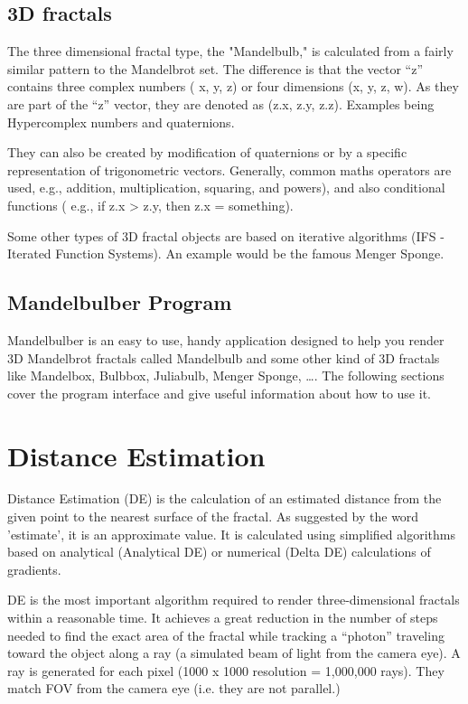 \hypertarget{d-fractals}{\subsection{3D fractals}\label{d-fractals}}

The three dimensional fractal type, the "Mandelbulb," is calculated from
a fairly similar pattern to the Mandelbrot set. The difference is that
the vector ``z'' contains three complex numbers ( x, y, z) or four
dimensions (x, y, z, w). As they are part of the ``z'' vector, they are
denoted as (z.x, z.y, z.z). Examples being Hypercomplex numbers and
quaternions.

They can also be created by modification of quaternions or by a specific
representation of trigonometric vectors. Generally, common maths
operators are used, e.g., addition, multiplication, squaring, and
powers), and also conditional functions ( e.g., if z.x \textgreater{}
z.y, then z.x = something).

Some other types of 3D fractal objects are based on iterative algorithms
(IFS - Iterated Function Systems). An example would be the famous Menger
Sponge.

\hypertarget{mandelbulber-program}{\subsection{Mandelbulber
Program}\label{mandelbulber-program}}

Mandelbulber is an easy to use, handy application designed to help you
render 3D Mandelbrot fractals called Mandelbulb and some other kind of
3D fractals like Mandelbox, Bulbbox, Juliabulb, Menger Sponge, \ldots{}.
The following sections cover the program interface and give useful
information about how to use it.

\hypertarget{distance-estimation}{\section{Distance
Estimation}\label{distance-estimation}}

Distance Estimation (DE) is the calculation of an estimated distance
from the given point to the nearest surface of the fractal. As suggested
by the word 'estimate', it is an approximate value. It is calculated
using simplified algorithms based on analytical (Analytical DE) or
numerical (Delta DE) calculations of gradients.

DE is the most important algorithm required to render three-dimensional
fractals within a reasonable time. It achieves a great reduction in the
number of steps needed to find the exact area of the fractal while
tracking a ``photon'' traveling toward the object along a ray (a
simulated beam of light from the camera eye). A ray is generated for
each pixel (1000 x 1000 resolution = 1,000,000 rays). They match FOV
from the camera eye (i.e. they are not parallel.)

